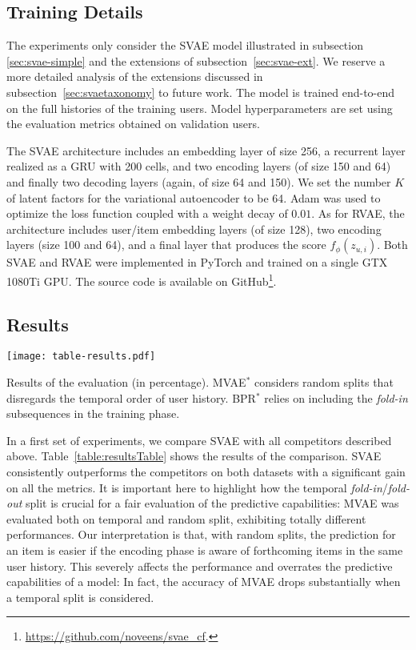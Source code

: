 \documentclass[sigconf]{acmart}
\newcommand{\bs}[1]{\ensuremath{\bm{\mathit{#1}}}}
\numberwithin{equation}{section}
\begin{document}
\subsection{Training Details}
The experiments only consider the SVAE model illustrated in subsection
\ref{sec:svae-simple} and the extensions of subsection~\ref{sec:svae-ext}. We
reserve a more detailed analysis of the extensions discussed in
subsection~\ref{sec:svaetaxonomy} to future work. 
The model is trained end-to-end on the full histories of the training
users.
Model hyperparameters are set using
the evaluation metrics obtained on validation users.


The SVAE architecture includes an embedding layer of size 256, a recurrent layer 
realized as a GRU with 200 cells, and two encoding layers (of size 150
and 64) and finally two decoding layers (again, of size 64 and 150).
We set the number $K$ of latent factors for the
variational autoencoder to be 64. Adam \cite{KingmaB14} was used to
optimize the loss function coupled with a weight decay of $0.01$.
As for RVAE, the architecture includes user/item embedding layers (of
size 128), two encoding layers (size 100 and 64), and a final layer
that produces the score $f_\phi(\bs{z}_{u,i})$. 
Both SVAE and RVAE were implemented in PyTorch \cite{paszke2017automatic}
and trained on a single GTX 1080Ti GPU.
The source code is available
on GitHub\footnote{\url{https://github.com/noveens/svae_cf}.}. 

\subsection{Results}

\begin{table*}
\begin{center}
\texttt{[image: table-results.pdf]}
\caption{Results of the evaluation (in percentage). MVAE$^\ast$ considers random
  splits that disregards the temporal order of user history.
  BPR$^\ast$ relies on including the \textit{fold-in} subsequences in
  the training phase.}
\label{table:resultsTable}
\end{center}
\end{table*}

In a first set of experiments, we compare SVAE with all competitors
described above. Table~\ref{table:resultsTable} shows the results of
the comparison. SVAE consistently outperforms the competitors on both
datasets with a significant gain on all the metrics. It is important
here to highlight how the temporal \textit{fold-in}/\textit{fold-out}
split is crucial for a fair evaluation of the predictive capabilities:
MVAE was evaluated both on temporal and random split, exhibiting
totally different performances. Our interpretation is that, with
random splits, the prediction for an item is easier if the encoding
phase is aware of forthcoming items in the same user history. This
severely affects the performance and overrates the predictive
capabilities of a model: In fact, the accuracy of MVAE drops
substantially when a temporal split is considered.
\end{document}
